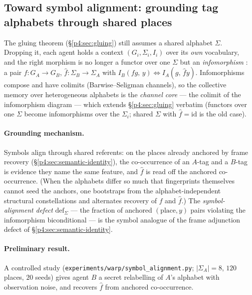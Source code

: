 \documentclass{article}
\newcommand{\method}[1]{\texttt{#1}}
\begin{document}
\subsection{Toward symbol alignment: grounding tag alphabets through shared places}
\label{p4:sec:symbol-alignment}

The gluing theorem (\S\ref{p4:sec:gluing}) still assumes a shared alphabet
$\Sigma$. Dropping it, each agent holds a context $(G_i,\Sigma_i,I_i)$ over its
\emph{own} vocabulary, and the right morphism is no longer a functor over one
$\Sigma$ but an \emph{infomorphism} \citep{barwise1997information}: a pair
$f:G_A\!\to\!G_B$, $\hat f:\Sigma_B\!\to\!\Sigma_A$ with
$I_B(f g,\,y)\Leftrightarrow I_A(g,\,\hat f y)$. Infomorphisms compose and have
colimits (Barwise--Seligman channels), so the collective memory over
heterogeneous alphabets is the \emph{channel core} --- the colimit of the
infomorphism diagram --- which extends \S\ref{p4:sec:gluing} verbatim (functors
over one $\Sigma$ become infomorphisms over the $\Sigma_i$; shared $\Sigma$ with
$\hat f=\mathrm{id}$ is the old case).

\paragraph{Grounding mechanism.} Symbols align through shared referents: on the
places already anchored by frame recovery (\S\ref{p4:sec:semantic-identity}), the
co-occurrence of an $A$-tag and a $B$-tag is evidence they name the same
feature, and $\hat f$ is read off the anchored co-occurrence. (When the
alphabets differ so much that fingerprints themselves cannot seed the anchors,
one bootstraps from the alphabet-independent structural constellations and
alternates recovery of $f$ and $\hat f$.) The \emph{symbol-alignment defect}
$\mathrm{def}_\Sigma$ --- the fraction of anchored $(\text{place},y)$ pairs
violating the infomorphism biconditional --- is the symbol analogue of the
frame adjunction defect of \S\ref{p4:sec:semantic-identity}.

\paragraph{Preliminary result.} A controlled study
(\method{experiments/warp/symbol\_alignment.py}; $|\Sigma_A|{=}8$, $120$ places,
$20$ seeds) gives agent $B$ a secret relabelling of $A$'s alphabet with
observation noise, and recovers $\hat f$ from anchored co-occurrence.
\end{document}
